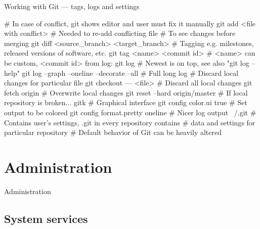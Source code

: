 \documentclass[compress, ucs, xelatex, 11pt, xcolor=svgnames, aspectratio=169,
	hyperref={
		bookmarks=true,
		unicode=true,
		colorlinks=true,
		pdftitle={Linux, command line and MetaCentrum},
		plainpages=false,
		pdfauthor={Vojtech Zeisek},
		pdfsubject={Course about use of Linux command line, writing shell scripts and using MetaCentrum of CESNET},
		pdfcreator={XeLaTeX},
		pdfkeywords={Linux, GNU, BASH, shell, command line, MetaCentrum},
		linkcolor=DarkRed, %
		anchorcolor=DarkBlue, %
		citecolor=Indigo, %
		filecolor=NavyBlue, %
		menucolor=DarkMagenta, %
		urlcolor=DarkBlue, %
		pdftex},
	url={hyphens, lowtilde} %
	]{beamer}
\begin{document}
\begin{frame}[fragile]{Working with Git --- tags, logs and settings}
	\begin{bashcode}
    # In case of conflict, git shows editor and user must fix it manually
    git add <file with conflict> # Needed to re-add conflicting file
    # To see changes before merging
    git diff <source_branch> <target_branch>
    # Tagging e.g. milestones, released versions of software, etc.
    git tag <name> <commit id> # <name> can be custom, <commit id> from log:
    git log # Newest is on top, see also "git log --help"
    git log --graph --oneline --decorate --all # Full long log
    # Discard local changes for particular file
    git checkout --- <file>
    # Discard all local changes
    git fetch origin # Overwrite local changes
    git reset --hard origin/master # If local repository is broken...
    gitk # Graphical interface
    git config color.ui true # Set output to be colored
    git config format.pretty oneline # Nicer log output
    ~/.git # Contains user's settings, .git in every repository contains
           # data and settings for particular repository
           # Default behavior of Git can be heavily altered
	\end{bashcode}
\end{frame}


\section{Administration}

\begin{frame}{Administration}
	\tableofcontents[currentsection, sectionstyle=show/hide, hideothersubsections]
\end{frame}


\subsection{System services}
\end{document}
